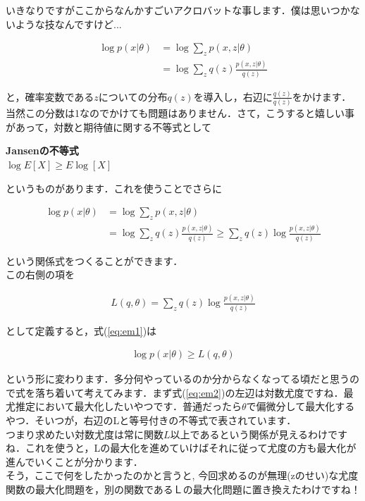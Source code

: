 \documentclass[11pt,a4paper,dvipdfmx]{ujreport}
\begin{document}
いきなりですがここからなんかすごいアクロバットな事します．僕は思いつかないような技なんですけど...

\begin{align}
  \log p(x|\theta) &= \log \sum_z p(x,z|\theta)\\
  &= \log \sum_z q(z) \frac{p(x,z|\theta)}{q(z)} 
\end{align}

と，確率変数である$z$についての分布$q(z)$を導入し，右辺に$\frac{q(z)}{q(z)}$をかけます．当然この分数は1なのでかけても問題はありません．さて，こうすると嬉しい事があって，対数と期待値に関する不等式として  

\begin{screen}
  \textbf{Jansenの不等式}\\
  $\log E[X] \geq E \log[X]$
\end{screen}

というものがあります．これを使うことでさらに

\begin{align}
  \log p(x|\theta) &= \log \sum_z p(x,z|\theta)\\
  &= \log \sum_z q(z) \frac{p(x,z|\theta)}{q(z)} \geq \sum_z q(z) \log \frac{p(x,z|\theta)}{q(z)}
\end{align}

という関係式をつくることができます．\\
この右側の項を

\begin{align}
  L(q,\theta) = \sum_z q(z) \log \frac{p(x,z|\theta)}{q(z)}
\end{align}

として定義すると，式(\ref{eq:em1})は

\begin{align}
  \label{eq:em2}
  \log p(x|\theta) \geq L(q,\theta)
\end{align}

という形に変わります．多分何やっているのか分からなくなってる頃だと思うので式を落ち着いて考えてみます．まず式(\ref{eq:em2})の左辺は対数尤度ですね．最尤推定において最大化したいやつです．普通だったら$\theta$で偏微分して最大化するやつ．そいつが，右辺のLと等号付きの不等式で表されています．\\

つまり求めたい対数尤度は常に関数$L$以上であるという関係が見えるわけですね．これを使うと，Lの最大化を進めていけばそれに従って尤度の方も最大化が進んでいくことが分かります．\\

そう，ここで何をしたかったのかと言うと, 今回求めるのが無理(zのせい)な尤度関数の最大化問題を，別の関数であるＬの最大化問題に置き換えたわけですね！\\
\end{document}
